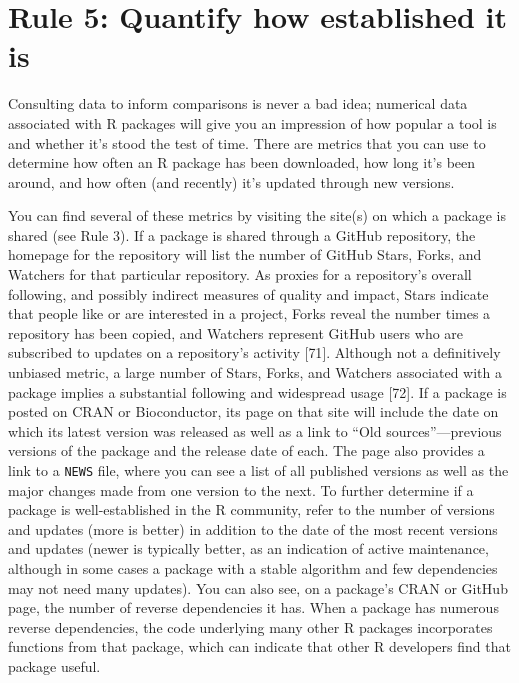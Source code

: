 \documentclass[10pt,letterpaper]{article}
\begin{document}
\hypertarget{rule-5-quantify-how-established-it-is}{%
\section{Rule 5: Quantify how established it
is}\label{rule-5-quantify-how-established-it-is}}

Consulting data to inform comparisons is never a bad idea; numerical
data associated with R packages will give you an impression of how
popular a tool is and whether it's stood the test of time. There are
metrics that you can use to determine how often an R package has been
downloaded, how long it's been around, and how often (and recently) it's
updated through new versions.

You can find several of these metrics by visiting the site(s) on which a
package is shared (see Rule 3). If a package is shared through a GitHub
repository, the homepage for the repository will list the number of
GitHub Stars, Forks, and Watchers for that particular repository. As
proxies for a repository's overall following, and possibly indirect
measures of quality and impact, Stars indicate that people like or are
interested in a project, Forks reveal the number times a repository has
been copied, and Watchers represent GitHub users who are subscribed to
updates on a repository's activity {[}71{]}. Although not a definitively
unbiased metric, a large number of Stars, Forks, and Watchers associated
with a package implies a substantial following and widespread usage
{[}72{]}. If a package is posted on CRAN or Bioconductor, its page on
that site will include the date on which its latest version was released
as well as a link to ``Old sources''---previous versions of the package
and the release date of each. The page also provides a link to a
\texttt{NEWS} file, where you can see a list of all published versions
as well as the major changes made from one version to the next. To
further determine if a package is well-established in the R community,
refer to the number of versions and updates (more is better) in addition
to the date of the most recent versions and updates (newer is typically
better, as an indication of active maintenance, although in some cases a
package with a stable algorithm and few dependencies may not need many
updates). You can also see, on a package's CRAN or GitHub page, the
number of reverse dependencies it has. When a package has numerous
reverse dependencies, the code underlying many other R packages
incorporates functions from that package, which can indicate that other
R developers find that package useful.
\end{document}
